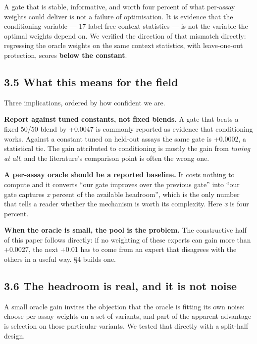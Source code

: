 A gate that is stable, informative, and worth four percent of what per-assay weights could deliver is
not a failure of optimisation. It is evidence that the conditioning variable --- 17 label-free context
statistics --- is not the variable the optimal weights depend on. We verified the direction of that
mismatch directly: regressing the oracle weights on the same context statistics, with leave-one-out
protection, scores \textbf{below the constant}.

\hypertarget{what-this-means-for-the-field}{%
\subsection{3.5 What this means for the field}\label{what-this-means-for-the-field}}

Three implications, ordered by how confident we are.

\textbf{Report against tuned constants, not fixed blends.} A gate that beats a fixed 50/50 blend by +0.0047
is commonly reported as evidence that conditioning works. Against a constant tuned on held-out assays
the same gate is +0.0002, a statistical tie. The gain attributed to conditioning is mostly the gain from
\emph{tuning at all}, and the literature's comparison point is often the wrong one.

\textbf{A per-assay oracle should be a reported baseline.} It costs nothing to compute and it converts ``our
gate improves over the previous gate'' into ``our gate captures \emph{x} percent of the available headroom'',
which is the only number that tells a reader whether the mechanism is worth its complexity. Here \emph{x} is
four percent.

\textbf{When the oracle is small, the pool is the problem.} The constructive half of this paper follows
directly: if no weighting of these experts can gain more than +0.0027, the next +0.01 has to come from
an expert that disagrees with the others in a useful way. §4 builds one.

\hypertarget{the-headroom-is-real-and-it-is-not-noise}{%
\subsection{3.6 The headroom is real, and it is not noise}\label{the-headroom-is-real-and-it-is-not-noise}}

A small oracle gain invites the objection that the oracle is fitting its own noise: choose per-assay
weights on a set of variants, and part of the apparent advantage is selection on those particular
variants. We tested that directly with a split-half design.

